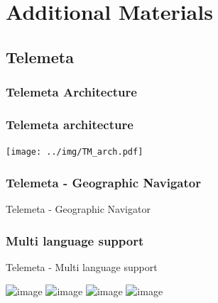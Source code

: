 \documentclass[final, hyperref, table]{beamer}
\begin{document}
\appendix
\section{Additional Materials}
\subsection{Telemeta}
\subsubsection{Telemeta Architecture}
\begin{frame}\frametitle{Telemeta architecture}
  \begin{center}
    \texttt{[image: ../img/TM\_arch.pdf]}
  \end{center}
\end{frame}
\subsubsection{Telemeta - Geographic Navigator}
\begin{frame}[plain, label=geonavigator]{Telemeta - Geographic Navigator}
  \begin{center}
  \end{center}
\hyperlink{telemeta_features}{}
\end{frame}
\subsubsection{Multi language support}
\begin{frame}[label=telemeta_languages]{Telemeta - Multi language support}

  \begin{center}
    \includegraphics<1>[width=1.1\textwidth]{telemeta_english.png}
    \includegraphics<2>[width=1.1\textwidth]{telemeta_french.png}
    \includegraphics<3>[width=1.1\textwidth]{telemeta_german.png}
    \includegraphics<4>[width=1.1\textwidth]{telemeta_chinese.png}
  \end{center}
\hyperlink{telemeta_features}{}
\end{frame}
\end{document}
